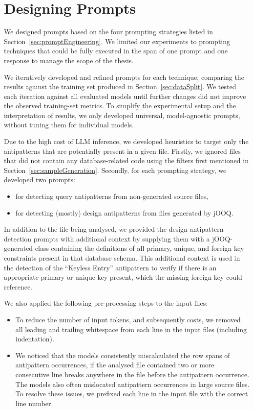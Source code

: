 \section{Designing Prompts}\label{sec:prompts}

We designed prompts based on the four prompting strategies listed in Section~\ref{sec:promptEngineering}. We limited our experiments to prompting techniques that could be fully executed in the span of one prompt and one response to manage the scope of the thesis.

We iteratively developed and refined prompts for each technique, comparing the results against the training set produced in Section~\ref{sec:dataSplit}. We tested each iteration against all evaluated models until further changes did not improve the observed training-set metrics. To simplify the experimental setup and the interpretation of results, we only developed universal, model-agnostic prompts, without tuning them for individual models.

Due to the high cost of LLM inference, we developed heuristics to target only the antipatterns that are potentially present in a given file. Firstly, we ignored files that did not contain any database-related code using the filters first mentioned in Section~\ref{sec:sampleGeneration}. Secondly, for each prompting strategy, we developed two prompts:

\begin{itemize}
    \item for detecting query antipatterns from non-generated source files,
    \item for detecting (mostly) design antipatterns from files generated by jOOQ.
\end{itemize}

In addition to the file being analysed, we provided the design antipattern detection prompts with additional context by supplying them with a jOOQ-generated class containing the definitions of all primary, unique, and foreign key constraints present in that database schema. This additional context is used in the detection of the “Keyless Entry” antipattern to verify if there is an appropriate primary or unique key present, which the missing foreign key could reference.

We also applied the following pre-processing steps to the input files:
\begin{itemize}
    \item To reduce the number of input tokens, and subsequently costs, we removed all leading and trailing whitespace from each line in the input files (including indentation).
    \item We noticed that the models consistently miscalculated the row spans of antipattern occurrences, if the analysed file contained two or more consecutive line breaks anywhere in the file before the antipattern occurrence. The models also often mislocated antipattern occurrences in large source files. To resolve these issues, we prefixed each line in the input file with the correct line number.
\end{itemize}

